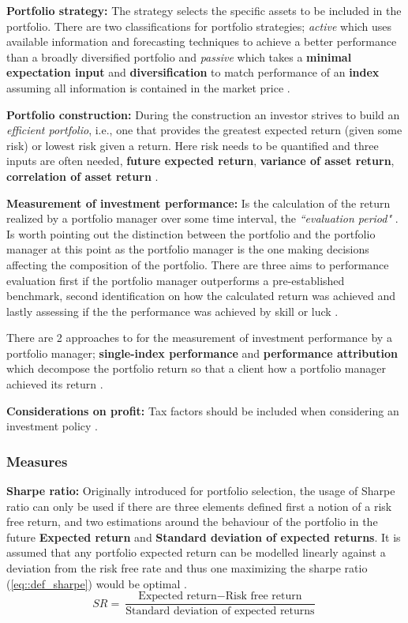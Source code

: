 \textbf{Portfolio strategy:} The strategy selects the specific assets to be included in the portfolio. There are two classifications for portfolio strategies; \textit{active} which uses available information and forecasting techniques to achieve a better performance than a broadly diversified portfolio and \textit{passive} which takes a \textbf{minimal expectation input} and \textbf{diversification} to match performance of an \textbf{index} assuming all information is contained in the market price \cite{investment_management_book_2010}.

\textbf{Portfolio construction:} During the construction an investor strives to build an \textit{efficient portfolio}, i.e., one that provides the greatest expected return (given some risk) or lowest risk given a return. Here risk needs to be quantified and three inputs are often needed, \textbf{future expected return}, \textbf{variance of asset return}, \textbf{correlation of asset return} \cite{investment_management_book_2010}.

\textbf{Measurement of investment performance:} Is the calculation of the return realized by a portfolio manager over some time interval, the \textit{``evaluation period"} \cite{investment_management_book_2010}. Is worth pointing out the distinction between the portfolio and the portfolio manager at this point as the portfolio manager is the one making decisions affecting the composition of the portfolio. There are three aims to performance evaluation first if the portfolio manager outperforms a pre-established benchmark, second identification on how the calculated return was achieved and lastly assessing if the the performance was achieved by skill or luck \cite{investment_management_book_2010}.

There are 2 approaches to for the measurement of investment performance by a portfolio manager; \textbf{single-index performance} and \textbf{performance attribution} which decompose the portfolio return so that a client how a portfolio manager achieved its return \cite{investment_management_book_2010}. 

\textbf{Considerations on profit:} Tax factors should be included when considering an investment policy \cite{investment_management_book_2010}.

\subsubsection{Measures}
\textbf{Sharpe ratio:} Originally introduced for portfolio selection, the usage of Sharpe ratio can only be used if there are three elements defined first a notion of a risk free return, and two estimations around the behaviour of the portfolio in the future \textbf{Expected return} and \textbf{Standard deviation of expected returns}. It is assumed that any portfolio expected return can be modelled linearly against a deviation from the risk free rate and thus one maximizing the sharpe ratio (\ref{eq::def_sharpe}) would be optimal \cite{sharpe_ratio_og}.
\begin{equation}
    \label{eq::def_sharpe}
    SR = \frac{\text{Expected return} - \text{Risk free return}}{\text{Standard deviation of expected returns}}
\end{equation}

